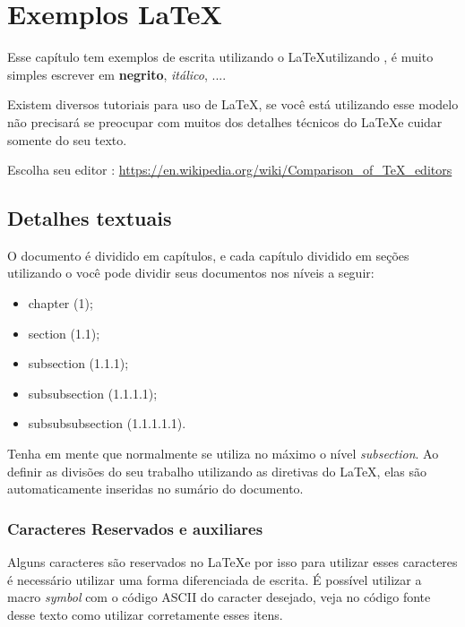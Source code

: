 \chapter{Exemplos \LaTeX}
\label{cap-exemplos}



Esse capítulo tem exemplos de escrita utilizando o \LaTeX  utilizando \abnTeX, é muito simples escrever em \textbf{negrito}, \emph{itálico}, ....


Existem diversos tutoriais para uso de \LaTeX, se você está utilizando esse modelo não precisará se preocupar com muitos dos detalhes técnicos do \LaTeX \space e cuidar somente do seu texto.

Escolha seu editor : \url{https://en.wikipedia.org/wiki/Comparison\_of\_TeX\_editors}




\section{Detalhes textuais}

O documento é dividido em capítulos, e cada capítulo dividido em seções utilizando o \abnTeX \space você pode dividir seus documentos nos níveis a seguir:

\begin{itemize}
\item chapter (1);
\item section (1.1);
\item subsection (1.1.1);
\item subsubsection (1.1.1.1);
\item subsubsubsection (1.1.1.1.1).
\end{itemize}

Tenha em mente que normalmente se utiliza no máximo o nível \emph{subsection}.
Ao definir as divisões do seu trabalho utilizando as diretivas do \LaTeX, elas são automaticamente inseridas no sumário do documento.


\subsection{Caracteres Reservados e auxiliares}



Alguns caracteres são reservados no \LaTeX \space e por isso para utilizar esses caracteres é necessário utilizar uma forma diferenciada de escrita. É possível utilizar a macro \emph{symbol} com o código ASCII do caracter desejado, veja no código fonte desse texto como utilizar corretamente esses itens.


